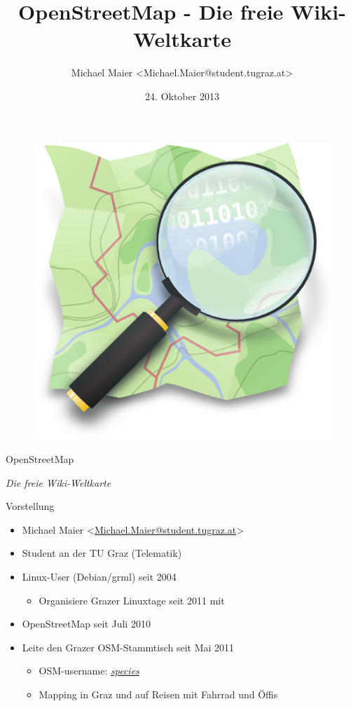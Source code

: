 \documentclass{beamer}
\title{OpenStreetMap - Die freie Wiki-Weltkarte}
\author{Michael Maier \textless Michael.Maier@student.tugraz.at\textgreater}
\date{24. Oktober 2013}
\begin{document}

\begin{frame} 


\begin{figure}
  \centering
  \includegraphics[width=.5\textwidth]{mag_map.png}
\end{figure}

\begin{center}
\Huge{OpenStreetMap\\}
\end{center}

\begin{center}
\Large{\emph{Die freie Wiki-Weltkarte}}
\end{center}

\end{frame}



\begin{frame}{Vorstellung}

  \begin{itemize}
    \item Michael Maier \textless \href{mailto:Michael.Maier@student.tugraz.at}{Michael.Maier@student.tugraz.at}\textgreater
    \item Student an der TU Graz (Telematik)
    \item Linux-User (Debian/grml) seit 2004
      \begin{itemize}
                \item Organisiere Grazer Linuxtage seit 2011 mit
              \end{itemize}
    \item OpenStreetMap seit Juli 2010
    \item Leite den Grazer OSM-Stammtisch seit Mai 2011
    \begin{itemize}
      \item OSM-username: \emph{\href{http://www.openstreetmap.org/user/species}{species}}
      \item Mapping in Graz und auf Reisen mit Fahrrad und Öffis
    \end{itemize}
  \end{itemize}
\end{frame}
\end{document}
